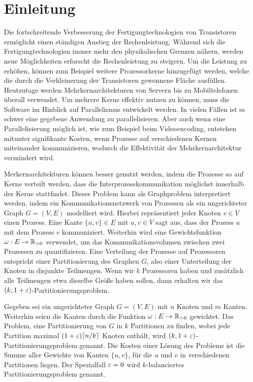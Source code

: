 \chapter{Einleitung}\label{chapter:introduction}
Die fortschreitende Verbesserung der Fertigungtechnologien von Transistoren ermöglicht einen ständigen Anstieg der Rechenleistung.
Während sich die Fertigungtechnologien immer mehr den physikalischen Grenzen nähern, werden neue Möglichkeiten erforscht die Rechenleistung zu steigern.
Um die Leistung zu erhöhen, können zum Beispiel weitere Prozessorkerne hinzugefügt werden, welche die durch die Verkleinerung der Transistoren gewonnene Fläche ausfüllen.
Heutzutage werden Mehrkernarchitekturen von Servern bis zu Mobiltelefonen überall verwendet.
Um mehrere Kerne effektiv nutzen zu können, muss die Software im Hinblick auf Parallelismus entwickelt werden.
In vielen Fällen ist es schwer eine gegebene Anwendung zu parallelisieren.
Aber auch wenn eine Parallelisierung möglich ist, wie zum Beispiel beim Videoencoding, entstehen mitunter signifikante Kosten, wenn Prozesse auf verschiedenen Kernen miteinander kommunizieren, wodurch die Effektivität der Mehrkernarchitektur vermindert wird.~\cite{LTS09}

Merkernarchitekturen können besser genutzt werden, indem die Prozesse so auf Kerne verteilt werden, dass die Interprozesskommunikation möglichst innerhalb der Kerne stattfindet.
Dieses Problem kann als Graphproblem interpretiert werden, indem ein Kommunikationsnetzwerk von Prozessen als ein ungerichteter Graph $G = (V, E)$ modelliert wird.
Hierbei repräsentiert jeder Knoten $v \in V$ einen Prozess.
Eine Kante $\{u, v\} \in E$ mit $u, v \in V$ sagt aus, dass der Prozess $u$ mit dem Prozess $v$ kommuniziert.
Weiterhin wird eine Gewichtsfunktion $\omega : E \rightarrow \mathbb{R}_{>0}$ verwendet, um das Kommunikationsvolumen zwischen zwei Prozessen zu quantifizieren.
Eine Verteilung der Prozesse auf Prozessoren entspricht einer Partitionierung des Graphen $G$, also einer Unterteilung der Knoten in disjunkte Teilmengen.
Wenn wir $k$ Prozessoren haben und zusätzlich alle Teilmengen etwa dieselbe Größe haben sollen, dann erhalten wir das $(k, 1 + \varepsilon)$\hyp Partitionierungsproblem.

\begin{defn}
    Gegeben sei ein ungerichteter Graph $G = (V, E)$ mit $n$ Knoten und $m$ Kanten.
    Weiterhin seien die Kanten durch die Funktion $\omega : E \rightarrow \mathbb{R}_{> 0}$ gewichtet.
    Das Problem, eine Partitionierung von $G$ in $k$ Partitionen zu finden, wobei jede Partition maximal $(1 + \varepsilon) \lceil n/k\rceil$ Knoten enthält, wird $(k,1 + \varepsilon)$\hyp Partitionierungsproblem genannt.
    Die Kosten einer Lösung des Problems ist die Summe aller Gewichte von Kanten $\{u, v\}$, für die $u$ und $v$ in verschiedenen Partitionen liegen.
    Der Spezialfall $\varepsilon=0$ wird $k$\hyp balanciertes Partitionierungsproblem genannt.
\end{defn}

